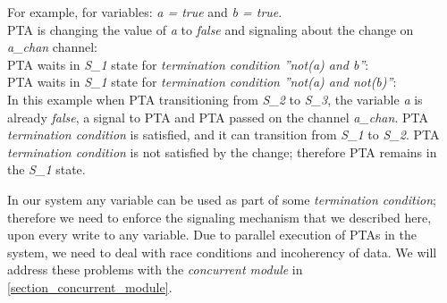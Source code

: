 \par For example, for variables: \textit{a = true} and \textit{b = true}. \\
PTA is changing the value of \textit{a} to \textit{false} and signaling about the change on \textcolor{ColorUppaalChannel}{\textit{a_chan}} channel: \\
 PTA waits in \textcolor{ColorUppaalState}{\textit{S_1}} state for \textit{termination condition} \textit{”not(a) and b”}: \\
 PTA waits in \textcolor{ColorUppaalState}{\textit{S_1}} state for \textit{termination condition} \textit{”not(a) and not(b)”}:\\
 In this example when PTA transitioning from \textcolor{ColorUppaalState}{\textit{S_2}} to \textcolor{ColorUppaalState}{\textit{S_3}}, the variable \textit{a} is already \textit{false}, a signal to PTA and PTA passed on the channel \textcolor{ColorUppaalChannel}{\textit{a_chan}}. PTA \textit{termination condition} is satisfied, and it can transition from \textcolor{ColorUppaalState}{\textit{S_1}} to \textcolor{ColorUppaalState}{\textit{S_2}}. PTA \textit{termination condition} is not satisfied by the change; therefore PTA remains in the \textcolor{ColorUppaalState}{\textit{S_1}} state.
\par In our system any variable can be used as part of some \textit{termination condition}; therefore we need to enforce the signaling mechanism that we described here, upon every write to any variable. Due to parallel execution of PTAs in the system, we need to deal with race conditions and incoherency of data. We will address these problems with the \textit{concurrent module} in \ref{section_concurrent_module}. \\
